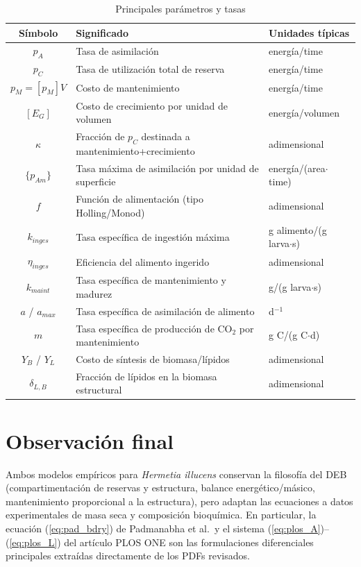\documentclass[11pt,a4paper]{article}
\begin{document}
\begin{table}[htbp]
\centering
\caption{Principales parámetros y tasas}
\begin{tabular}{@{}cll@{}}
\toprule
\textbf{Símbolo} & \textbf{Significado} & \textbf{Unidades típicas} \\
\midrule
$p_A$ & Tasa de asimilación & energía/time \\
$p_C$ & Tasa de utilización total de reserva & energía/time \\
$p_M=[p_M]V$ & Costo de mantenimiento & energía/time \\
$[E_G]$ & Costo de crecimiento por unidad de volumen & energía/volumen \\
$\kappa$ & Fracción de $p_C$ destinada a mantenimiento+crecimiento & adimensional \\
$\{p_{Am}\}$ & Tasa máxima de asimilación por unidad de superficie & energía/(area$\cdot$time) \\
$f$ & Función de alimentación (tipo Holling/Monod) & adimensional \\
$k_{inges}$ & Tasa específica de ingestión máxima & g alimento/(g larva$\cdot$s) \\
$\eta_{inges}$ & Eficiencia del alimento ingerido & adimensional \\
$k_{maint}$ & Tasa específica de mantenimiento y madurez & g/(g larva$\cdot$s) \\
$a$ / $a_{max}$ & Tasa específica de asimilación de alimento & d$^{-1}$ \\
$m$ & Tasa específica de producción de CO$_2$ por mantenimiento & g C/(g C$\cdot$d) \\
$Y_B$ / $Y_L$ & Costo de síntesis de biomasa/lípidos & adimensional \\
$\delta_{L,B}$ & Fracción de lípidos en la biomasa estructural & adimensional \\
\bottomrule
\end{tabular}
\end{table}

\section*{Observación final}

Ambos modelos empíricos para \textit{Hermetia illucens} conservan la filosofía del DEB (compartimentación de reservas y estructura, balance energético/másico, mantenimiento proporcional a la estructura), pero adaptan las ecuaciones a datos experimentales de masa seca y composición bioquímica. En particular, la ecuación (\ref{eq:pad_bdry}) de Padmanabha et al.\ y el sistema (\ref{eq:plos_A})--(\ref{eq:plos_L}) del artículo PLOS ONE son las formulaciones diferenciales principales extraídas directamente de los PDFs revisados.
\end{document}
